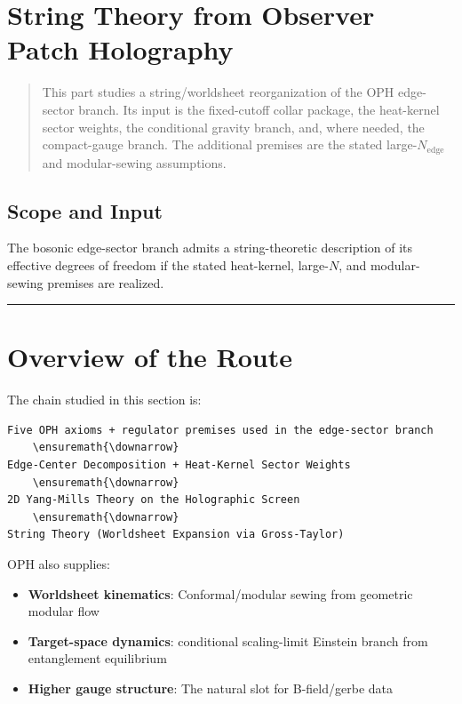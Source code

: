\section{String Theory from Observer Patch Holography}\label{string-theory-from-observer-patch-holography}

\begin{quote}
This part studies a string/worldsheet reorganization of the OPH edge-sector branch. Its input is the fixed-cutoff collar package, the heat-kernel sector weights, the conditional gravity branch, and, where needed, the compact-gauge branch. The additional premises are the stated large-\(N_{\mathrm{edge}}\) and modular-sewing assumptions.
\end{quote}

\subsection{Scope and Input}\label{a-complete-derivation}

The bosonic edge-sector branch admits a string-theoretic description of its effective degrees of freedom if the stated heat-kernel, large-\(N\), and modular-sewing premises are realized.

\begin{center}\rule{0.5\linewidth}{0.5pt}\end{center}

\section{Overview of the Route}\label{1-overview-what-we-derive}

The chain studied in this section is:

\begin{verbatim}
Five OPH axioms + regulator premises used in the edge-sector branch
    \ensuremath{\downarrow}
Edge-Center Decomposition + Heat-Kernel Sector Weights
    \ensuremath{\downarrow}
2D Yang-Mills Theory on the Holographic Screen
    \ensuremath{\downarrow}
String Theory (Worldsheet Expansion via Gross-Taylor)
\end{verbatim}

OPH also supplies:

\begin{itemize}
\tightlist
\item
  \textbf{Worldsheet kinematics}: Conformal/modular sewing from geometric modular flow
\item
  \textbf{Target-space dynamics}: conditional scaling-limit Einstein branch from entanglement equilibrium
\item
  \textbf{Higher gauge structure}: The natural slot for B-field/gerbe data
\end{itemize}

